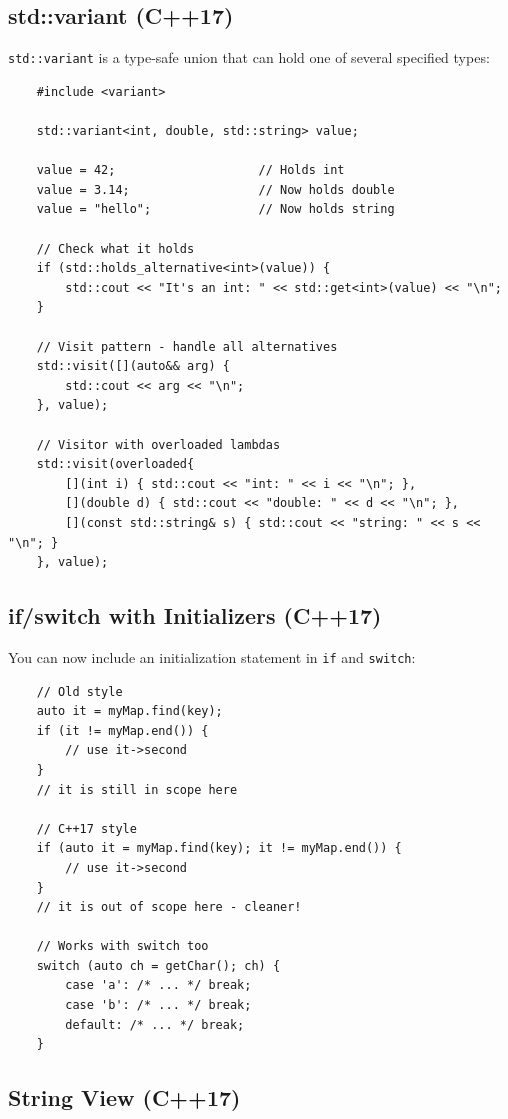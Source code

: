 \subsection{std::variant (C++17)}

\texttt{std::variant} is a type-safe union that can hold one of several specified types:

\begin{lstlisting}
	#include <variant>
	
	std::variant<int, double, std::string> value;
	
	value = 42;                    // Holds int
	value = 3.14;                  // Now holds double
	value = "hello";               // Now holds string
	
	// Check what it holds
	if (std::holds_alternative<int>(value)) {
		std::cout << "It's an int: " << std::get<int>(value) << "\n";
	}
	
	// Visit pattern - handle all alternatives
	std::visit([](auto&& arg) {
		std::cout << arg << "\n";
	}, value);
	
	// Visitor with overloaded lambdas
	std::visit(overloaded{
		[](int i) { std::cout << "int: " << i << "\n"; },
		[](double d) { std::cout << "double: " << d << "\n"; },
		[](const std::string& s) { std::cout << "string: " << s << "\n"; }
	}, value);
\end{lstlisting}

\subsection{if/switch with Initializers (C++17)}

You can now include an initialization statement in \texttt{if} and \texttt{switch}:

\begin{lstlisting}
	// Old style
	auto it = myMap.find(key);
	if (it != myMap.end()) {
		// use it->second
	}
	// it is still in scope here
	
	// C++17 style
	if (auto it = myMap.find(key); it != myMap.end()) {
		// use it->second
	}
	// it is out of scope here - cleaner!
	
	// Works with switch too
	switch (auto ch = getChar(); ch) {
		case 'a': /* ... */ break;
		case 'b': /* ... */ break;
		default: /* ... */ break;
	}
\end{lstlisting}

\subsection{String View (C++17)}


